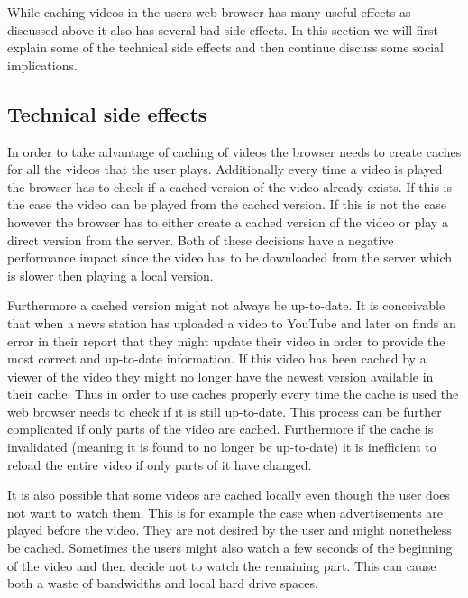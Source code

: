 While caching videos in the users web browser has many useful effects as discussed above it also has several bad side effects. In this section we will first explain some of the technical side effects and then continue discuss some social implications.
\subsection{Technical side effects}
In order to take advantage of caching of videos the browser needs to create caches for all the videos that the user plays. Additionally every time a video is played the browser has to check if a cached version of the video already exists. If this is the case the video can be played from the cached version. If this is not the case however the browser has to either create a cached version of the video or play a direct version from the server.  Both of these decisions have a negative performance impact since the video has to be downloaded from the server which is slower then playing a local version.

Furthermore a cached version might not always be up-to-date. It is conceivable that when a news station has uploaded a video to YouTube and later on finds an error in their report that they might update their video in order to provide the most correct and up-to-date information. If this video has been cached by a viewer of the video they might no longer have the newest version available in their cache. Thus in order to use caches properly every time the cache is used the web browser needs to check if it is still up-to-date. This process can be further complicated if only parts of the video are cached. Furthermore if the cache is invalidated (meaning it is found to no longer be up-to-date) it is inefficient to reload the entire video if only parts of it have changed.

It is also possible that some videos are cached locally even though the user does not want to watch them. This is for example the case when advertisements are played before the video. They are not desired by the user and might nonetheless be cached. Sometimes the users might also watch a few seconds of the beginning of the video and then decide not to watch the remaining part. This can cause both a waste of bandwidths and local hard drive spaces.

